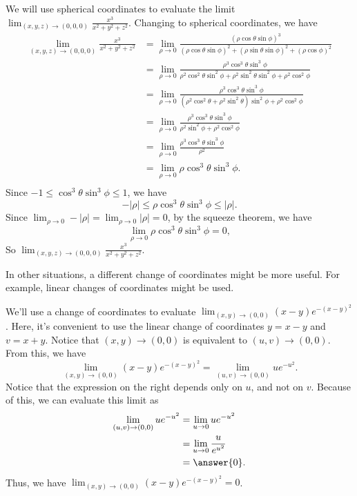\documentclass{ximera}
\begin{document}
\begin{example}
We will use spherical coordinates to evaluate the limit $\lim_{(x,y,z)\rightarrow (0,0,0)}\frac{x^3}{x^2+y^2+z^2}$. Changing to spherical coordinates, we have
\begin{align*}
\lim_{(x,y,z)\rightarrow (0,0,0)}\frac{x^3}{x^2+y^2+z^2} &= \lim_{\rho\rightarrow 0}\frac{(\rho\cos\theta\sin\phi)^3}{(\rho\cos\theta\sin\phi)^2+(\rho\sin\theta\sin\phi)^2+(\rho\cos\phi)^2}\\
&= \lim_{\rho\rightarrow 0}\frac{\rho^3\cos^3\theta\sin^3\phi}{\rho^2\cos^2\theta\sin^2\phi+\rho^2\sin^2\theta\sin^2\phi+\rho^2\cos^2\phi}\\
&= \lim_{\rho\rightarrow 0}\frac{\rho^3\cos^3\theta\sin^3\phi}{(\rho^2\cos^2\theta+\rho^2\sin^2\theta)\sin^2\phi+\rho^2\cos^2\phi}\\
&= \lim_{\rho\rightarrow 0}\frac{\rho^3\cos^3\theta\sin^3\phi}{\rho^2\sin^2\phi+\rho^2\cos^2\phi}\\
&= \lim_{\rho\rightarrow 0}\frac{\rho^3\cos^3\theta\sin^3\phi}{\rho^2}\\
&= \lim_{\rho\rightarrow 0}\rho\cos^3\theta\sin^3\phi.\\
\end{align*}
Since $-1\leq \cos^3\theta\sin^3\phi\leq 1$, we have
\[
-|\rho|\leq \rho\cos^3\theta\sin^3\phi\leq |\rho|.
\]
Since $\lim_{\rho\rightarrow 0}-|\rho| = \lim_{\rho\rightarrow 0}|\rho|=0$, by the squeeze theorem, we have
\[
\lim_{\rho\rightarrow 0}\rho\cos^3\theta\sin^3\phi = 0,
\]
So $\lim_{(x,y,z)\rightarrow (0,0,0)}\frac{x^3}{x^2+y^2+z^2}$.
\end{example}

In other situations, a different change of coordinates might be more useful. For example, linear changes of coordinates might be used.

\begin{example}
We'll use a change of coordinates to evaluate $\lim_{(x,y)\rightarrow(0,0)} (x-y)e^{-(x-y)^2}$. Here, it's convenient to use the linear change of coordinates $y=x-y$ and $v=x+y$. Notice that $(x,y)\rightarrow (0,0)$ is equivalent to $(u,v)\rightarrow (0,0)$. From this, we have
\[
\lim_{(x,y)\rightarrow(0,0)} (x-y)e^{-(x-y)^2} = \lim_{(u,v)\rightarrow (0,0)} ue^{-u^2}.
\]
Notice that the expression on the right depends only on $u$, and not on $v$. Because of this, we can evaluate this limit as
\begin{align*}
\lim_{(u,v)\rightarrow (0,0)} ue^{-u^2} &= \lim_{u\rightarrow 0} ue^{-u^2}\\
&= \lim_{u\rightarrow 0}\frac{u}{e^{u^2}}\\
&= \answer{0}.
\end{align*}
Thus, we have $\lim_{(x,y)\rightarrow(0,0)} (x-y)e^{-(x-y)^2}=0$.

\end{example}
\end{document}
